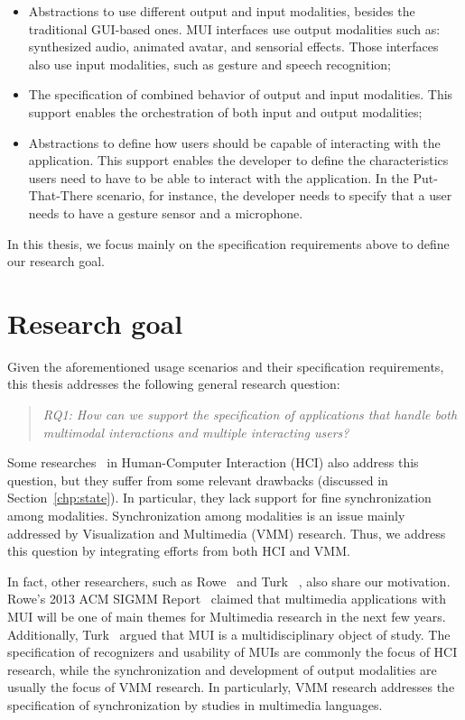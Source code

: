 \documentclass[
  doutorado,
  american
]{ThesisPUC}
\newcommand{\sect}[1]{Section~\ref{#1}}
\begin{document}
\begin{itemize}	
	\item Abstractions to use different output and input modalities, besides the
	traditional GUI-based ones. MUI interfaces use output modalities such as:
	synthesized audio, animated avatar, and sensorial effects. Those interfaces
	also use input modalities, such as gesture and speech recognition;
	\item The specification of combined behavior of output and input modalities.
	This support enables the orchestration of both input and output modalities;
	\item Abstractions to define how users should be capable of interacting with
	the application. This support enables the developer to define the
	characteristics users need to have to be able to interact with the
	application. In the Put-That-There scenario, for instance, the developer needs
	to specify that a user needs to have a gesture sensor and a microphone. 
\end{itemize}

In this thesis, we focus mainly on the specification requirements above to
define our research goal.

\section{Research goal}
\label{sec:intro:goal}

Given the aforementioned usage scenarios and their specification requirements,
this thesis addresses the following general research question:

\begin{quote}
	\textit{RQ1: How can we support the specification of applications that handle
	both multimodal interactions and multiple interacting users?}
\end{quote}

Some 
researches~\cite{dumas_description_2010,katsurada_xisl:_2005,w3c_multimodal_2003}
in Human-Computer Interaction (HCI) also address
this question, but they suffer from some relevant drawbacks (discussed in
\sect{chp:state}). In particular, they lack support for fine synchronization
among modalities. Synchronization among modalities is an issue mainly addressed
by Visualization and Multimedia (VMM) research. Thus, we address this question
by integrating efforts from both HCI and VMM. 

In fact, other researchers, such as Rowe~\cite{rowe_looking_2013} and Turk
~\cite{turk_multimodal_2014}, also share our motivation. Rowe’s 2013 ACM SIGMM
Report~\cite{rowe_looking_2013} claimed that multimedia applications with MUI
will be one of main themes for Multimedia research in the next few years.
Additionally, Turk~\cite{turk_multimodal_2014} argued that MUI is a
multidisciplinary object of study. The specification of recognizers and
usability of MUIs are commonly the focus of HCI research, while the
synchronization and development of output modalities are usually the focus of
VMM research. In particularly, VMM research addresses the specification of
synchronization by studies in multimedia languages.
\end{document}

